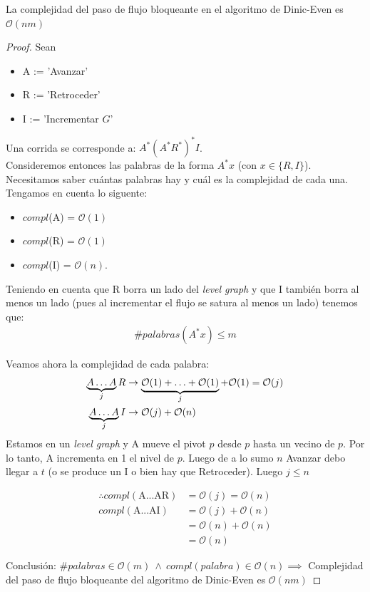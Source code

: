 \begin{theorem}
La complejidad del paso de flujo bloqueante en el algoritmo de Dinic-Even es $\mathcal{O}(nm)$
\end{theorem}
\begin{proof}
Sean \begin{itemize}
    \item A := 'Avanzar'
    \item R := 'Retroceder'
    \item I := 'Incrementar $G$'
\end{itemize}
Una corrida se corresponde a:
$A^*(A^*R^*)^*I$.\\
Consideremos entonces las palabras de la forma $A^*x$ (con $x \in \{ R, I \}$).
Necesitamos saber cuántas palabras hay y cuál es la complejidad de cada una.
Tengamos en cuenta lo siguente:
\begin{itemize}
    \item $compl$(A) = $\mathcal{O}(1)$
    \item $compl$(R) = $\mathcal{O}(1)$
    \item $compl$(I) = $\mathcal{O}(n)$. 
\end{itemize}

Teniendo en cuenta que R borra un lado del \textit{level graph} y que I también borra al menos un lado (pues al incrementar el flujo se satura al menos un lado) tenemos que:
\begin{align}
    \#palabras(A^*x) \le m
\end{align}

Veamos ahora la complejidad de cada palabra:
\begin{align}
\underbrace{A\mathellipsis A}_j R &\rightarrow \underbrace{\mathcal{O}(1)+\mathellipsis+\mathcal{O}(1)}_j+ \mathcal{O}(1) = \mathcal{O}(j)\\
\underbrace{A\mathellipsis A}_j I &\rightarrow \mathcal{O}(j) + \mathcal{O}(n)
\end{align}
Estamos en un \textit{level graph} y A mueve el pivot $p$ desde $p$ hasta un vecino de $p$. Por lo tanto, A incrementa en 1 el nivel de $p$. Luego de a lo sumo $n$ Avanzar debo llegar a $t$ (o se produce un I o bien hay que Retroceder). Luego $j \le n$

\begin{align}
    \therefore compl(\text{A...AR}) &= \mathcal{O}(j) = \mathcal{O}(n)\\
    compl(\text{A...AI}) &= \mathcal{O}(j) + \mathcal{O}(n)\\
    &= \mathcal{O}(n) + \mathcal{O}(n)\\
    &= \mathcal{O}(n)
\end{align}

Conclusión: $\# palabras \in \mathcal{O}(m)\ \wedge \  compl(palabra) \in \mathcal{O}(n) \implies$
Complejidad del paso de flujo bloqueante del algoritmo de Dinic-Even es $\mathcal{O}(nm)$

\end{proof}

